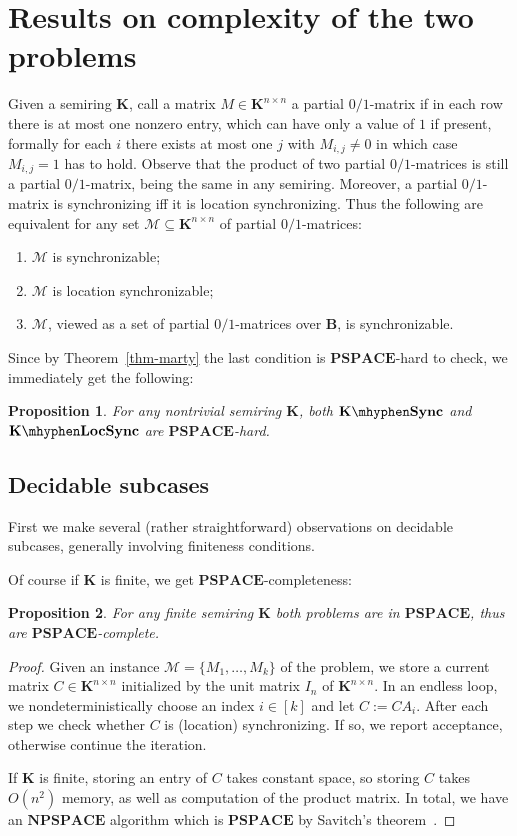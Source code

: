 \documentclass[submission,copyright,creativecommons]{eptcs}
\def\bK{{\mathbf{K}}}
\def\bB{{\mathbf{B}}}
\theoremstyle{plain}
\newtheorem{proposition}{Proposition}
\theoremstyle{definition}
\theoremstyle{remark}
\begin{document}
\section{Results on complexity of the two problems}

Given a semiring $\bK$, call a matrix $M\in\bK^{n\times n}$ a partial $0/1$-matrix if in each row there is at most one nonzero entry,
which can have only a value of $1$ if present, formally for each $i$ there exists at most one $j$ with $M_{i,j}\neq 0$ in which
case $M_{i,j}=1$ has to hold. Observe that the product of two partial $0/1$-matrices is still a partial $0/1$-matrix, being the
same in any semiring. Moreover, a partial $0/1$-matrix is synchronizing iff it is location synchronizing.
Thus the following are equivalent for any set $\mathcal{M}\subseteq\bK^{n\times n}$ of partial $0/1$-matrices:
\begin{enumerate}
\item $\mathcal{M}$ is synchronizable;
\item $\mathcal{M}$ is location synchronizable;
\item $\mathcal{M}$, viewed as a set of partial $0/1$-matrices over $\bB$, is synchronizable.
\end{enumerate}
Since by Theorem~\ref{thm-marty} the last condition is $\mathbf{PSPACE}$-hard to check, we immediately get the following:
\begin{proposition}
For any nontrivial semiring $\bK$, both $\bK\mhyphen\mathbf{Sync}$ and $\bK\mhyphen\mathbf{LocSync}$ are $\mathbf{PSPACE}$-hard.
\end{proposition}

\subsection{Decidable subcases}

First we make several (rather straightforward) observations on decidable subcases, generally involving finiteness conditions.

Of course if $\bK$ is finite, we get $\mathbf{PSPACE}$-completeness: 
\begin{proposition}
For any finite semiring $\bK$ both problems are in $\mathbf{PSPACE}$, thus are $\mathbf{PSPACE}$-complete.
\end{proposition}
\begin{proof}
Given an instance $\mathcal{M}=\{M_1,\ldots,M_k\}$ of the problem,
we store a current matrix $C\in\bK^{n\times n}$ initialized by the unit matrix $I_n$ of $\bK^{n\times n}$.
In an endless loop, we nondeterministically choose an index $i\in [k]$ and let $C:=CA_i$.
After each step we check whether $C$ is (location) synchronizing. If so, we report acceptance, otherwise
continue the iteration.

If $\bK$ is finite, storing an entry of $C$ takes constant space, so storing $C$ takes $O(n^2)$ memory,
as well as computation of the product matrix. In total, we have an $\mathbf{NPSPACE}$ algorithm which
is $\mathbf{PSPACE}$ by Savitch's theorem~\cite{papadimitriou}.
\end{proof}
\end{document}
